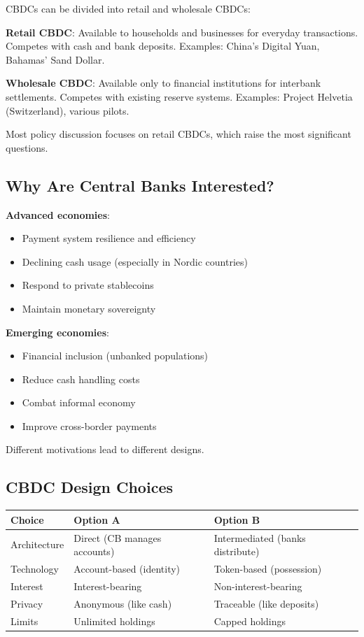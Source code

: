 \documentclass[11pt,a4paper]{article}
\begin{document}
CBDCs can be divided into retail and wholesale CBDCs:

\textbf{Retail CBDC}: Available to households and businesses for everyday transactions. Competes with cash and bank deposits. Examples: China's Digital Yuan, Bahamas' Sand Dollar.

\textbf{Wholesale CBDC}: Available only to financial institutions for interbank settlements. Competes with existing reserve systems. Examples: Project Helvetia (Switzerland), various pilots.

Most policy discussion focuses on retail CBDCs, which raise the most significant questions.

\subsection{Why Are Central Banks Interested?}

\textbf{Advanced economies}:
\begin{itemize}
    \item Payment system resilience and efficiency
    \item Declining cash usage (especially in Nordic countries)
    \item Respond to private stablecoins
    \item Maintain monetary sovereignty
\end{itemize}

\textbf{Emerging economies}:
\begin{itemize}
    \item Financial inclusion (unbanked populations)
    \item Reduce cash handling costs
    \item Combat informal economy
    \item Improve cross-border payments
\end{itemize}

Different motivations lead to different designs.

\subsection{CBDC Design Choices}

\begin{center}
\begin{tabular}{lll}
\toprule
\textbf{Choice} & \textbf{Option A} & \textbf{Option B} \\
\midrule
Architecture & Direct (CB manages accounts) & Intermediated (banks distribute) \\
Technology & Account-based (identity) & Token-based (possession) \\
Interest & Interest-bearing & Non-interest-bearing \\
Privacy & Anonymous (like cash) & Traceable (like deposits) \\
Limits & Unlimited holdings & Capped holdings \\
\bottomrule
\end{tabular}
\end{center}
\end{document}
